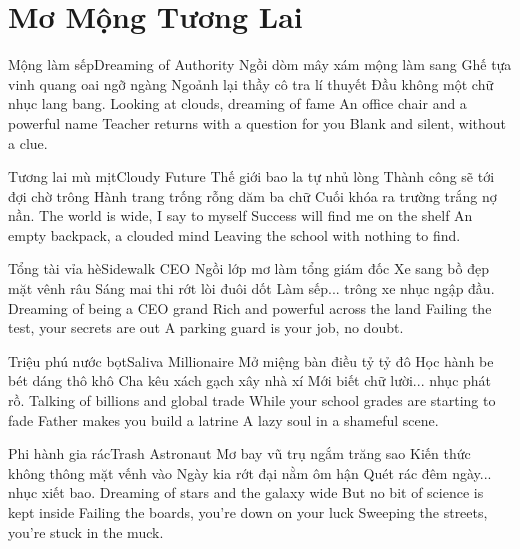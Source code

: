 \chapter{Mơ Mộng Tương Lai}

\begin{tutuyetbox}{Mộng làm sếp}{Dreaming of Authority}
Ngồi dòm mây xám mộng làm sang
Ghế tựa vinh quang oai ngỡ ngàng
Ngoảnh lại thầy cô tra lí thuyết
Đầu không một chữ nhục lang bang.
\tcblower
Looking at clouds, dreaming of fame 
An office chair and a powerful name 
Teacher returns with a question for you 
Blank and silent, without a clue.
\end{tutuyetbox}

\begin{tutuyetbox}{Tương lai mù mịt}{Cloudy Future}
Thế giới bao la tự nhủ lòng
Thành công sẽ tới đợi chờ trông
Hành trang trống rỗng dăm ba chữ
Cuối khóa ra trường trắng nợ nần.
\tcblower
The world is wide, I say to myself 
Success will find me on the shelf 
An empty backpack, a clouded mind 
Leaving the school with nothing to find.
\end{tutuyetbox}

\begin{tutuyetbox}{Tổng tài vỉa hè}{Sidewalk CEO}
Ngồi lớp mơ làm tổng giám đốc
Xe sang bồ đẹp mặt vênh râu
Sáng mai thi rớt lòi đuôi dốt
Làm sếp... trông xe nhục ngập đầu.
\tcblower
Dreaming of being a CEO grand
Rich and powerful across the land
Failing the test, your secrets are out
A parking guard is your job, no doubt.
\end{tutuyetbox}

\begin{tutuyetbox}{Triệu phú nước bọt}{Saliva Millionaire}
Mở miệng bàn điều tỷ tỷ đô
Học hành be bét dáng thô khô
Cha kêu xách gạch xây nhà xí
Mới biết chữ lười... nhục phát rồ.
\tcblower
Talking of billions and global trade
While your school grades are starting to fade
Father makes you build a latrine
A lazy soul in a shameful scene.
\end{tutuyetbox}

\begin{tutuyetbox}{Phi hành gia rác}{Trash Astronaut}
Mơ bay vũ trụ ngắm trăng sao
Kiến thức không thông mặt vếnh vào
Ngày kia rớt đại nằm ôm hận
Quét rác đêm ngày... nhục xiết bao.
\tcblower
Dreaming of stars and the galaxy wide
But no bit of science is kept inside
Failing the boards, you're down on your luck
Sweeping the streets, you're stuck in the muck.
\end{tutuyetbox}

